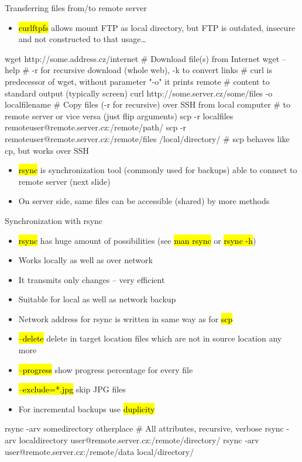 \documentclass[compress, ucs, xelatex, 11pt, xcolor=svgnames,
  hyperref={
    bookmarks=true,
    unicode=true,
    colorlinks=true,
    pdftitle={Linux, command line and MetaCentrum},
    plainpages=false,
    pdfauthor={Vojtech Zeisek},
    pdfsubject={Course about use of Linux command line, writing shell scripts and using MetaCentrum of CESNET},
    pdfcreator={XeLaTeX},
    pdfkeywords={Linux, GNU, BASH, shell, command line, MetaCentrum},
    linkcolor=DarkRed,
    anchorcolor=DarkBlue,
    citecolor=Indigo,
    filecolor=NavyBlue,
    menucolor=DarkMagenta,
    urlcolor=DarkBlue,
    pdftex},
  url={hyphens, lowtilde} %
  ]{beamer}
\renewcommand{\texttt}[1]{\hl{\ttfamily #1}}
\begin{document}
\begin{frame}[fragile]{Transferring files from/to remote server}
  \label{transfers}
  \begin{itemize}
    \item \texttt{curlftpfs} allows mount FTP as local directory, but FTP is outdated, insecure and not constructed to that usage\ldots
  \end{itemize}
  \begin{bashcode}
    wget http://some.address.cz/internet # Download file(s) from Internet
    wget --help # -r for recursive download (whole web), -k to convert links
    # curl is predecessor of wget, without parameter "-o" it prints remote
    # content to standard output (typically screen)
    curl http://some.server.cz/some/files -o localfilename
    # Copy files (-r for recursive) over SSH from local computer
    # to remote server or vice versa (just flip arguments)
    scp -r localfiles remoteuser@remote.server.cz:/remote/path/
    scp -r remoteuser@remote.server.cz:/remote/files /local/directory/
    # scp behaves like cp, but works over SSH
  \end{bashcode}
  \begin{itemize}
    \item \texttt{rsync} is synchronization tool (commonly used for backups) able to connect to remote server (next slide)
    \item On server side, same files can be accessible (shared) by more methods
  \end{itemize}
\end{frame}

\begin{frame}[fragile]{Synchronization with rsync}
  \begin{itemize}
    \item \texttt{rsync} has huge amount of possibilities (see \texttt{man rsync} or \texttt{rsync -h})
    \item Works locally as well as over network
    \item It transmits only changes -- very efficient
    \item Suitable for local as well as network backup
    \item Network address for rsync is written in same way as for \texttt{scp}
    \item \texttt{--delete} delete in target location files which are not in source location any more
    \item \texttt{--progress} show progress percentage for every file
    \item \texttt{--exclude=*.jpg} skip JPG files
    \item For incremental backups use \texttt{duplicity}
  \end{itemize}
  \begin{bashcode}
    rsync -arv somedirectory otherplace # All attributes, recursive, verbose
    rsync -arv localdirectory user@remote.server.cz:/remote/directory/
    rsync -arv user@remote.server.cz:/remote/data local/directory/
  \end{bashcode}
\end{frame}
\end{document}
